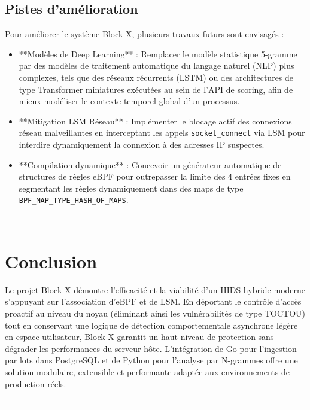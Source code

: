 \documentclass[11pt,a4paper]{article}
\begin{document}
\subsection{Pistes d'amélioration}
Pour améliorer le système Block-X, plusieurs travaux futurs sont envisagés :
\begin{itemize}
    \item **Modèles de Deep Learning** : Remplacer le modèle statistique 5-gramme par des modèles de traitement automatique du langage naturel (NLP) plus complexes, tels que des réseaux récurrents (LSTM) ou des architectures de type Transformer miniatures exécutées au sein de l'API de scoring, afin de mieux modéliser le contexte temporel global d'un processus.
    \item **Mitigation LSM Réseau** : Implémenter le blocage actif des connexions réseau malveillantes en interceptant les appels \texttt{socket\_connect} via LSM pour interdire dynamiquement la connexion à des adresses IP suspectes.
    \item **Compilation dynamique** : Concevoir un générateur automatique de structures de règles eBPF pour outrepasser la limite des 4 entrées fixes en segmentant les règles dynamiquement dans des maps de type \texttt{BPF\_MAP\_TYPE\_HASH\_OF\_MAPS}.
\end{itemize}

---

\section{Conclusion}
Le projet Block-X démontre l'efficacité et la viabilité d'un HIDS hybride moderne s'appuyant sur l'association d'eBPF et de LSM. En déportant le contrôle d'accès proactif au niveau du noyau (éliminant ainsi les vulnérabilités de type TOCTOU) tout en conservant une logique de détection comportementale asynchrone légère en espace utilisateur, Block-X garantit un haut niveau de protection sans dégrader les performances du serveur hôte. L'intégration de Go pour l'ingestion par lots dans PostgreSQL et de Python pour l'analyse par N-grammes offre une solution modulaire, extensible et performante adaptée aux environnements de production réels.

---
\end{document}
